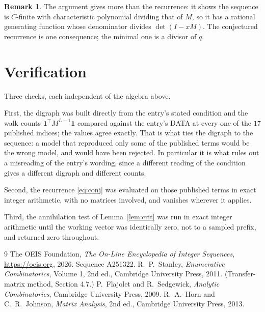 \documentclass[11pt,a4paper]{article}
\theoremstyle{plain}
\theoremstyle{definition}
\newtheorem{remark}[theorem]{Remark}
\begin{document}
\begin{remark}
The argument gives more than the recurrence: it shows the sequence is $C$-finite with
characteristic polynomial dividing that of $M$, so it has a rational generating function
whose denominator divides $\det(I-xM)$. The conjectured recurrence is one consequence; the
minimal one is a divisor of $q$.
\end{remark}

\section{Verification}

Three checks, each independent of the algebra above.

First, the digraph was built directly from the entry's stated condition and the walk counts
$\mathbf{1}^{\!\top}M^{L-1}\mathbf{1}$ compared against the entry's DATA at
every one of the $17$ published indices; the values agree exactly. That is what ties
the digraph to the sequence: a model that reproduced only some of the published terms would
be the wrong model, and would have been rejected. In particular it is what rules out a
misreading of the entry's wording, since a different reading of the condition gives a
different digraph and different counts.

Second, the recurrence \eqref{eq:conj} was evaluated on those published terms in exact
integer arithmetic, with no matrices involved, and vanishes wherever it applies.

Third, the annihilation test of Lemma~\ref{lem:crit} was run in exact integer arithmetic
until the working vector was identically zero, not to a sampled prefix, and returned zero
throughout.

\begin{thebibliography}{9}
 The OEIS Foundation, \emph{The On-Line Encyclopedia of Integer
Sequences}, \url{https://oeis.org}, 2026. Sequence A251322.
 R.~P.~Stanley, \emph{Enumerative Combinatorics}, Volume 1, 2nd ed.,
Cambridge University Press, 2011. (Transfer-matrix method, Section 4.7.)
 P.~Flajolet and R.~Sedgewick, \emph{Analytic Combinatorics}, Cambridge
University Press, 2009.
 R.~A.~Horn and C.~R.~Johnson, \emph{Matrix Analysis}, 2nd ed., Cambridge
University Press, 2013.
\end{thebibliography}
\end{document}
